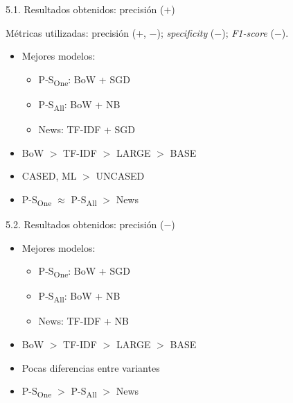 \begin{frame}{5.1. Resultados obtenidos: precisión ($+$)}

Métricas utilizadas: precisión (+, $-$); \textit{specificity} ($-$); \textit{F1-score} ($-$).

\vspace{2ex}

\begin{itemize}
    \item Mejores modelos:
    \begin{itemize}
        \item {P-S}\textsubscript{One}: BoW + SGD
        \item {P-S}\textsubscript{All}: BoW + NB
        \item News: TF-IDF + SGD
    \end{itemize}
    \item BoW $>$ TF-IDF $>$ LARGE $>$ BASE
    \item CASED, ML $>$ UNCASED %
    \item {P-S}\textsubscript{One} $\approx$ {P-S}\textsubscript{All} $>$ News
\end{itemize}

\end{frame}

\begin{frame}{5.2. Resultados obtenidos: precisión ($-$)}
\begin{itemize}
    \item Mejores modelos:
    \begin{itemize}
        \item {P-S}\textsubscript{One}: BoW + SGD
        \item {P-S}\textsubscript{All}: BoW + NB
        \item News: TF-IDF + NB
    \end{itemize}
    \item BoW $>$ TF-IDF $>$ LARGE $>$ BASE
    \item Pocas diferencias entre variantes
    \item {P-S}\textsubscript{One} $>$ {P-S}\textsubscript{All} $>$ News
\end{itemize}    

\end{frame}

